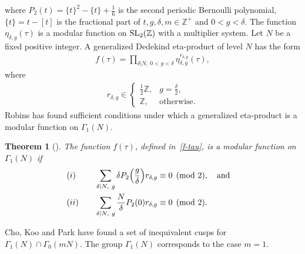 \documentclass[pdftex]{sigma}
\numberwithin{equation}{section}
\newtheorem{Theorem}{Theorem}[section]
\theoremstyle{definition}
\begin{document}
where $P_2(t)=\{t\}^2-\{t\}+\frac{1}{6}$ is the second periodic Bernoulli polynomial, $\{t\}=t-[t]$ is the fractional part of $t, g, \delta, m\in\mathbb{Z}^{+}$ and $0 < g < \delta$. The function $\eta_{\delta,g}(\tau)$ is a modular function on ${\rm SL}_2(\mathbb{Z})$ with a multiplier system. Let $N$ be a fixed positive integer. A generalized Dedekind eta-product of level $N$ has the form
\begin{align}\label{f-tau}
f(\tau)=\prod_{\delta|N,~0 < g < \delta}\eta_{\delta,g}^{r_{\delta,g}}(\tau),
\end{align}
where
\begin{align*}%
r_{\delta,g}\in \begin{cases}
			\frac{1}{2}\mathbb{Z},  &g=\frac{\delta}{2},\\
			\mathbb{Z}, &\text{otherwise}.\end{cases}
\end{align*}
Robins \cite{Ro94} has found sufficient conditions under which a generalized eta-product is a modular function on $\Gamma_1(N)$.
\begin{Theorem}[{\cite[Theorem 3]{Ro94}}]\label{Thm-2.1}
The function $f(\tau)$, defined in~\eqref{f-tau}, is a modular function on~$\Gamma_1(N)$ if
\begin{alignat*}{3}
&(i) \quad && \sum_{\delta|N,~g}\delta P_2\Bigl(\frac{g}{\delta}\Bigr)r_{\delta,g} \equiv 0 \pmod 2, \quad \text{and}& \\
&(ii) \quad && \sum_{\delta|N,~g}\frac{N}{\delta}P_2(0)r_{\delta,g} \equiv 0 \pmod 2.&
\end{alignat*}
\end{Theorem}
Cho, Koo and Park \cite{CKP09} have found a set of inequivalent cusps for $\Gamma_1(N)\cap\Gamma_0(mN)$. The group $\Gamma_1(N)$ corresponds to the case $m=1$.
\end{document}
